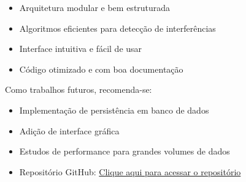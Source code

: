 \documentclass[a4paper, 12pt]{article}
\begin{document}
\begin{itemize}
\item Arquitetura modular e bem estruturada
\item Algoritmos eficientes para detecção de interferências
\item Interface intuitiva e fácil de usar
\item Código otimizado e com boa documentação
\end{itemize}

Como trabalhos futuros, recomenda-se:

\begin{itemize}
\item Implementação de persistência em banco de dados
\item Adição de interface gráfica
\item Estudos de performance para grandes volumes de dados
\item Repositório GitHub: \href{https://github.com/JoaoLoureiro06/EDA-Project.git}{Clique aqui para acessar o repositório}
\end{itemize}
\end{document}
